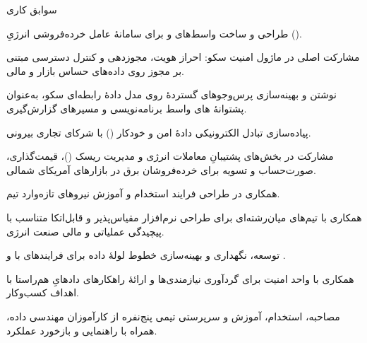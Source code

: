 \documentclass[11pt]{article}
\begin{document}
\begin{faSection}{سوابق کاری}

\begin{faItems}
  \item طراحی و ساخت واسط‌های  و  برای سامانۀ عامل خرده‌فروشی انرژیِ  ().
  \item مشارکت اصلی در ماژول امنیت سکو: احراز هویت، مجوزدهی و کنترل دسترسی مبتنی بر مجوز روی داده‌های حساس بازار و مالی.
  \item نوشتن و بهینه‌سازی پرس‌وجوهای گستردۀ  روی مدل دادۀ رابطه‌ای سکو، به‌عنوان پشتوانۀ های واسط برنامه‌نویسی و مسیرهای گزارش‌گیری.
  \item پیاده‌سازی تبادل الکترونیکی دادۀ امن و خودکار () با شرکای تجاری بیرونی.
  \item مشارکت در بخش‌های پشتیبانِ معاملات انرژی و مدیریت ریسک ()، قیمت‌گذاری، صورت‌حساب و تسویه برای خرده‌فروشان برق در بازارهای آمریکای شمالی.
  \item همکاری در طراحی فرایند استخدام و آموزش نیروهای تازه‌وارد تیم.
  \item همکاری با تیم‌های میان‌رشته‌ای برای طراحی نرم‌افزار مقیاس‌پذیر و قابل‌اتکا متناسب با پیچیدگی عملیاتی و مالی صنعت انرژی.
\end{faItems}

\begin{faItems}
  \item توسعه، نگهداری و بهینه‌سازی خطوط لولۀ داده برای فرایندهای  با  و .
  \item همکاری با واحد امنیت برای گردآوری نیازمندی‌ها و ارائۀ راهکارهای دادهایِ هم‌راستا با اهداف کسب‌وکار.
  \item مصاحبه، استخدام، آموزش و سرپرستی تیمی پنج‌نفره از کارآموزان مهندسی داده، همراه با راهنمایی و بازخورد عملکرد.
\end{faItems}

\end{faSection}
\end{document}
